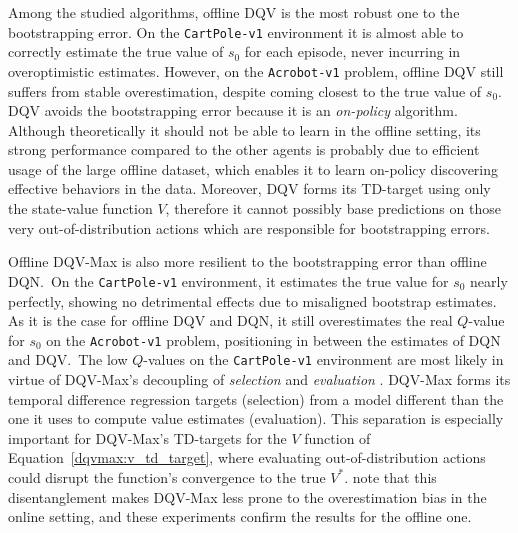 Among the studied algorithms, offline DQV is the most robust one to
the bootstrapping error. On the \texttt{CartPole-v1} environment it is
almost able to correctly estimate the true value of $s_0$ for each
episode, never incurring in overoptimistic estimates. However, on the
\texttt{Acrobot-v1} problem, offline DQV still suffers from stable
overestimation, despite coming closest to the true value of $s_0$.
DQV avoids the bootstrapping error because it is an \textit{on-policy}
algorithm. Although theoretically it should not be able to learn in
the offline setting, its strong
performance compared to the other agents is probably due to efficient
usage of the large offline dataset, which enables it to learn on-policy
discovering effective behaviors in the data. Moreover, DQV forms its
TD-target using only the state-value function $V$, therefore it cannot
possibly base predictions on those very out-of-distribution actions
which are responsible for bootstrapping errors.

Offline DQV-Max is also more resilient to the bootstrapping error than
offline DQN.\ On the \texttt{CartPole-v1} environment, it estimates
the true value for $s_0$ nearly perfectly, showing no detrimental
effects due to misaligned bootstrap estimates. As it is the case for
offline DQV and DQN, it still overestimates the real $Q$-value for
$s_0$ on the \texttt{Acrobot-v1} problem, positioning in between the
estimates of DQN and DQV.\ The low $Q$-values on the
\texttt{CartPole-v1} environment are most likely in virtue of
DQV-Max's decoupling of \textit{selection} and \textit{evaluation}
\citep{van2016deep}. DQV-Max forms its temporal difference regression
targets (selection) from a model different than the one it uses to
compute value estimates (evaluation). This separation is especially
important for DQV-Max's TD-targets for the $V$ function of
Equation~\ref{dqvmax:v_td_target}, where evaluating
out-of-distribution actions could disrupt the function's
convergence to the true $V^*$. \citet{sabatelli2020deep} note that
this disentanglement makes DQV-Max less prone to the overestimation
bias in the online setting, and these experiments confirm the results
for the offline one.

